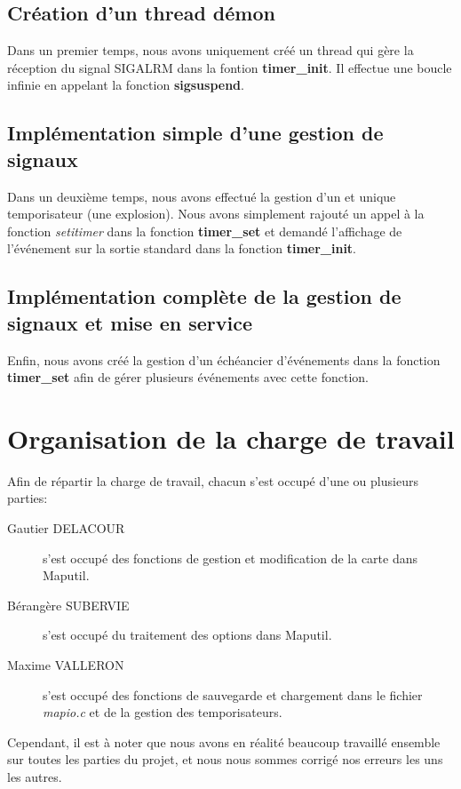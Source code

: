 \documentclass{report}
\begin{document}
\section{Création d'un thread démon}
Dans un premier temps, nous avons uniquement créé un thread qui gère la réception du signal SIGALRM dans la fontion \textbf{timer\_init}. Il effectue une boucle infinie en appelant la fonction \textbf{sigsuspend}.
\section{Implémentation simple d'une gestion de signaux}
Dans un deuxième temps, nous avons effectué la gestion d'un et unique temporisateur (une explosion). Nous avons simplement rajouté un appel à la fonction \textit{setitimer} dans la fonction \textbf{timer\_set} et demandé l'affichage de l'événement sur la sortie standard dans la fonction \textbf{timer\_init}.

\section{Implémentation complète de la gestion de signaux et mise en service}
Enfin, nous avons créé la gestion d'un échéancier d'événements dans la fonction \textbf{timer\_set} afin de gérer plusieurs événements avec cette fonction.

\chapter{Organisation de la charge de travail}
Afin de répartir la charge de travail, chacun s'est occupé d'une ou plusieurs parties:
\begin{description}
\item[Gautier DELACOUR] s'est occupé des fonctions de gestion et modification de la carte dans Maputil.
\item[Bérangère SUBERVIE] s'est occupé du traitement des options dans Maputil.
\item[Maxime VALLERON] s'est occupé des fonctions de sauvegarde et chargement dans le fichier \textit{mapio.c} et de la gestion des temporisateurs.
\end{description}

Cependant, il est à noter que nous avons en réalité beaucoup travaillé ensemble sur toutes les parties du projet, et nous nous sommes corrigé nos erreurs les uns les autres.
\end{document}
